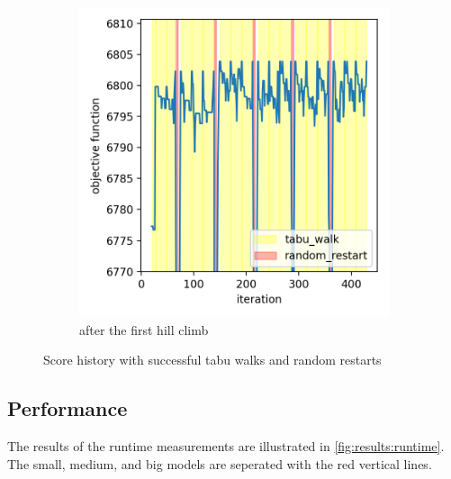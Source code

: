 \documentclass[sigconf, fleqn, prologue, dvipsnames]{acmart}
\begin{document}
\begin{figure}
\begin{subfigure}{0.2\textwidth}
		\includegraphics[scale=0.35]{graphics/tabu_small_2t_2.png}
		\caption{after the first hill climb}
	\end{subfigure}
	\caption{Score history with successful tabu walks and random restarts}
	\label{fig:results:parameterization}
\end{figure}

\subsection{Performance}
The results of the runtime measurements are illustrated in \autoref{fig:results:runtime}.
The small, medium, and big models are seperated with the red vertical lines.
\end{document}
